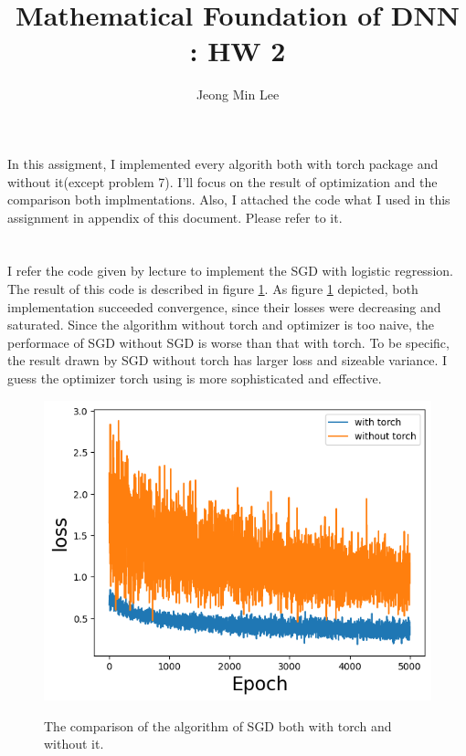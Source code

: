 \documentclass[10pt]{article}
\title{\textbf{Mathematical Foundation of DNN : HW 2}}
\author{Jeong Min Lee}
\begin{document}
\maketitle
In this assigment, I implemented every algorith both with torch package and without it(except problem 7). 
I'll focus on the result of optimization and the comparison both implmentations. Also, I attached the code what I used in this assignment in appendix of this document. Please refer to it.
\section{}

I refer the code given by lecture to implement the SGD with logistic regression. The result of this code is 
described in figure \ref{fig1}. As figure \ref{fig1} depicted, both implementation succeeded convergence, since their losses were decreasing and saturated.
Since the algorithm without torch and optimizer is too naive, the performace of SGD without SGD is worse than that with torch. To be specific, 
the result drawn by SGD without torch has larger loss and sizeable variance. I guess the optimizer torch using is more sophisticated and effective. 

\begin{figure}[!h]
    \begin{center}
        \includegraphics[scale = 0.5]{../hw2/fig/prob1.png}
        \label{fig1}
    \end{center}
    \caption{The comparison of the algorithm of SGD both with torch and without it.}
\end{figure}
\end{document}
